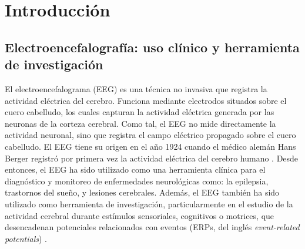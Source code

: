 %
\chapter{Introducción}
\label{sec:intro}






\section{Electroencefalografía: uso clínico y herramienta de investigación}
\label{sec:intro:eeg}

El electroencefalograma (EEG) es una técnica no invasiva que registra la actividad eléctrica del cerebro. Funciona mediante electrodos situados sobre el cuero cabelludo, los cuales capturan la actividad eléctrica generada por las neuronas de la corteza cerebral. Como tal, el EEG no mide directamente la actividad neuronal, sino que registra el campo eléctrico propagado sobre el cuero cabelludo. El EEG tiene su origen en el año 1924 cuando el médico alemán Hans Berger registró por primera vez la actividad eléctrica del cerebro humano \cite{bergerUeberElektrenkephalogrammMenschen1929}. Desde entonces, el EEG ha sido utilizado como una herramienta clínica para el diagnóstico y monitoreo de enfermedades neurológicas como: la epilepsia, trastornos del sueño, y lesiones cerebrales. \cite{niedermeyerElectroencephalographyBasicPrinciples2005} Además, el EEG también ha sido utilizado como herramienta de investigación, particularmente en el estudio de la actividad cerebral durante estímulos sensoriales, cognitivos o motrices, que desencadenan potenciales relacionados con eventos (ERPs, del inglés \emph{event-related potentials}) \cite{luckIntroductionEventrelatedPotential2014}. 

